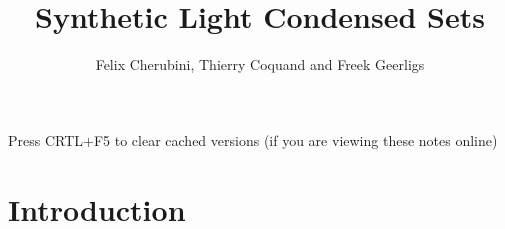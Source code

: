 \documentclass{../util/zariski-small}
\title{Synthetic Light Condensed Sets}
\begin{document}
\author{Felix Cherubini, Thierry Coquand and Freek Geerligs}

\maketitle

\begin{center}
  \color{purple}
  \large{Press CRTL+F5 to clear cached versions}
  \large{(if you are viewing these notes online)}
\end{center}

\section*{Introduction}


\printindex

\printbibliography
\end{document}
